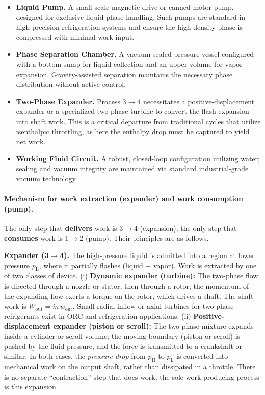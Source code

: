 \documentclass[11pt,a4paper]{article}
\begin{document}
\begin{itemize}
  \item \textbf{Liquid Pump.} A small-scale magnetic-drive or canned-motor 
  pump, designed for exclusive liquid phase handling. Such pumps are 
  standard in high-precision refrigeration systems and ensure the 
  high-density phase is compressed with minimal work input.
  \item \textbf{Phase Separation Chamber.} A vacuum-sealed pressure vessel 
  configured with a bottom sump for liquid collection and an upper volume 
  for vapor expansion. Gravity-assisted separation maintains the 
  necessary phase distribution without active control.
  \item \textbf{Two-Phase Expander.} Process 3$\to$4 necessitates a 
  positive-displacement expander or a specialized two-phase turbine to 
  convert the flash expansion into shaft work. This is a critical 
  departure from traditional cycles that utilize isenthalpic throttling, 
  as here the enthalpy drop must be captured to yield net work.
  \item \textbf{Working Fluid Circuit.} A robust, closed-loop configuration 
  utilizing water; sealing and vacuum integrity are maintained via 
  standard industrial-grade vacuum technology.
\end{itemize}

\paragraph{Mechanism for work extraction (expander) and work consumption (pump).}
The only step that \textbf{delivers} work is 3$\to$4 (expansion); the only step
that \textbf{consumes} work is 1$\to$2 (pump). Their principles are as follows.

\textbf{Expander (3$\to$4).} The high-pressure liquid is admitted into a region
at lower pressure $p_{\mathrm{L}}$, where it partially flashes (liquid + vapor).
Work is extracted by one of two classes of device. (i) \textbf{Dynamic expander
(turbine):} The two-phase flow is directed through a nozzle or stator, then
through a rotor; the momentum of the expanding flow exerts a torque on the
rotor, which drives a shaft. The shaft work is $W_{\mathrm{out}} =
\dot{m}\,w_{\mathrm{out}}$. Small radial-inflow or axial turbines for
two-phase refrigerants exist in ORC and refrigeration applications.
(ii) \textbf{Positive-displacement expander (piston or scroll):} The two-phase
mixture expands inside a cylinder or scroll volume; the moving boundary (piston
or scroll) is pushed by the fluid pressure, and the force is transmitted to a
crankshaft or similar. In both cases, the \emph{pressure drop} from $p_{\mathrm{H}}$
to $p_{\mathrm{L}}$ is converted into mechanical work on the output shaft,
rather than dissipated in a throttle. There is no separate ``contraction''
step that does work; the sole work-producing process is this expansion.
\end{document}

